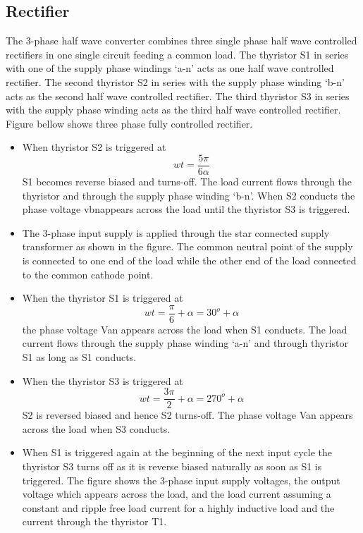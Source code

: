 \subsection{Rectifier}
The 3-phase half wave converter combines three single phase half wave controlled rectifiers in one single circuit feeding a common load. The thyristor S1 in series with one of the supply phase windings ‘a-n’ acts as one half wave controlled rectifier. The second thyristor S2 in series with the supply phase winding ‘b-n’ acts as the second half wave controlled rectifier. The third thyristor S3 in series with the supply phase winding acts as the third half wave controlled rectifier. Figure bellow shows three phase fully controlled rectifier.
\begin{itemize}
\item When thyristor S2 is triggered at 
 \begin{equation}
	w t =\frac{5 \pi }{6 \alpha}
	\end{equation}
  S1 becomes reverse biased and turns-off. The load current flows through the thyristor and through the supply phase winding ‘b-n’. When S2 conducts the phase voltage vbnappears across the load until the thyristor S3 is triggered.	
\item The 3-phase input supply is applied through the star connected supply transformer as shown in the figure. The common neutral point of the supply is connected to one end of the load while the other end of the load connected to the common cathode point.
\item When the thyristor S1 is triggered at 
\begin{equation}
	w t =\frac{\pi }{6} +\alpha = 30^o + \alpha
	\end{equation} 
	 the phase voltage Van appears across the load when S1 conducts. The load current flows through the supply phase winding ‘a-n’ and through thyristor S1 as long as S1 conducts.
\item When the thyristor S3 is triggered at 
\begin{equation}
	w t =\frac{3\pi }{2} +\alpha = 270^o + \alpha
	\end{equation}
S2 is reversed biased and hence S2 turns-off. The phase voltage Van appears across the load when S3 conducts.
\item When S1 is triggered again at the beginning of the next input cycle the thyristor S3 turns off as it is reverse biased naturally as soon as S1 is triggered. The figure shows the 3-phase input supply voltages, the output voltage which appears across the load, and the load current assuming a constant and ripple free load current for a highly inductive load and the current through the thyristor T1.

\end{itemize}
